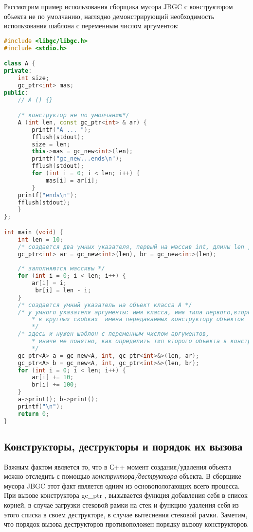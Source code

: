 Рассмотрим пример использования сборщика мусора JBGC  с конструктором объекта не по умолчанию,  наглядно демонстрирующий необходимость использования шаблона с переменным числом аргументов:
\pagebreak
\begin{lstlisting}[language= C++]
#include <libgc/libgc.h>
#include <stdio.h>

class A {
private:
	int size;
	gc_ptr<int> mas;
public:
  	// A () {}

	/* конструктор не по умолчанию*/
	A (int len, const gc_ptr<int> & ar) {
		printf("A ... ");
		fflush(stdout);
		size = len;
		this->mas = gc_new<int>(len);
		printf("gc_new...ends\n");
		fflush(stdout);
		for (int i = 0; i < len; i++) {
			mas[i] = ar[i];
		}
	printf("ends\n");
	fflush(stdout);
  	}
};

int main (void) {
	int len = 10;
	/* создается два умных указателя, первый на массив int, длины len ,второй такой же */
	gc_ptr<int> ar = gc_new<int>(len), br = gc_new<int>(len);
	
	/* заполняются массивы */
	for (int i = 0; i < len; i++) {
		ar[i] = i;
		 br[i] = len - i;
	}
	/* создается умный указатель на объект класса А */
	/* у умного указателя аргументы: имя класса, имя типа первого,второго поля;
	    * в круглых скобках  имена передаваемых конструктору объектов
	    */
	/* здесь и нужен шаблон с переменным числом аргументов,
	    * иначе не понятно, как определить тип второго объекта в конструкторе 
	    */
	gc_ptr<A> a = gc_new<A, int, gc_ptr<int>&>(len, ar);
	gc_ptr<A> b = gc_new<A, int, gc_ptr<int>&>(len, br);
	for (int i = 0; i < len; i++) {
		ar[i] += 10;
		br[i] += 100;
  	}
	a->print(); b->print();
	printf("\n");
	return 0;
}

\end{lstlisting}
 \subsection{Конструкторы, деструкторы и порядок их вызова} 

Важным фактом является то, что в С++  момент создания/удаления объекта можно отследить с помощью \textit{конструктора/деструктора} объекта. В сборщике мусора JBGC этот факт является одним из основопологающих всего процесса. При вызове конструктора gc\_ptr , вызывается функция добавления себя в список корней, в случае загрузки стековой рамки на стек и функцию удаления себя из этого списка в своем деструкторе, в случае вытеснения стековой рамки. Заметим, что порядок вызова деструкторов противоположен порядку вызову конструкторов. 